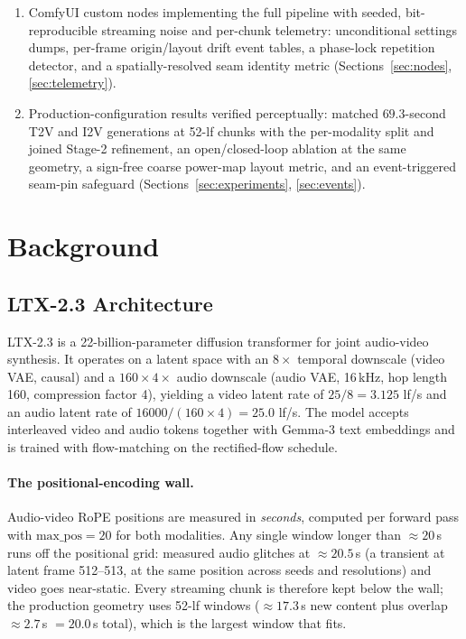 \documentclass[12pt]{article}
\begin{document}
\begin{enumerate}[leftmargin=*,noitemsep]
      packed audio-video latent representation (Section~\ref{sec:guider}).
\item ComfyUI custom nodes implementing the full pipeline with seeded,
      bit-reproducible streaming noise and per-chunk telemetry: unconditional
      settings dumps, per-frame origin/layout drift event tables, a phase-lock
      repetition detector, and a spatially-resolved seam identity metric
      (Sections~\ref{sec:nodes}, \ref{sec:telemetry}).
\item Production-configuration results verified perceptually: matched
      $69.3$-second T2V and I2V generations at 52-lf chunks with the
      per-modality split and joined Stage-2 refinement, an open/closed-loop
      ablation at the same geometry, a sign-free coarse power-map layout
      metric, and an event-triggered seam-pin safeguard
      (Sections~\ref{sec:experiments}, \ref{sec:events}).
\end{enumerate}

\section{Background}
\label{sec:background}

\subsection{LTX-2.3 Architecture}
LTX-2.3 is a 22-billion-parameter diffusion transformer for joint audio-video
synthesis.  It operates on a latent space with an $8\times$ temporal downscale
(video VAE, causal) and a $160\times4\times$ audio downscale (audio VAE,
16\,kHz, hop length 160, compression factor 4), yielding a video latent rate
of $25/8 = 3.125$ lf/s and an audio latent rate of $16000/(160\times4)=25.0$
lf/s.  The model accepts interleaved video and audio tokens together with
Gemma-3 text embeddings and is trained with flow-matching on the
rectified-flow schedule.

\paragraph{The positional-encoding wall.}
Audio-video RoPE positions are measured in \emph{seconds}, computed per forward
pass with $\text{max\_pos}=20$ for both modalities.  Any single window longer
than $\approx20$\,s runs off the positional grid: measured audio glitches at
$\approx20.5$\,s (a transient at latent frame 512--513, at the same position
across seeds and resolutions) and video goes near-static.  Every streaming
chunk is therefore kept below the wall; the production geometry uses
52-lf windows ($\approx17.3$\,s new content plus overlap $\approx2.7$\,s
$=20.0$\,s total), which is the largest window that fits.
\end{document}
